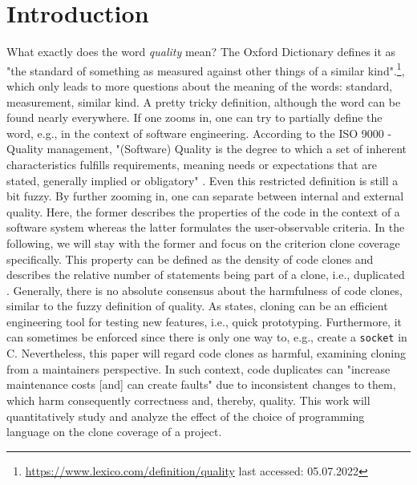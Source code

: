 
\section{Introduction}
\label{sec:intro}

What exactly does the word \textit{quality} mean? The Oxford Dictionary defines it as "the standard of something as measured against other things of a similar kind".\footnote{\url{https://www.lexico.com/definition/quality} last accessed: 05.07.2022}, which only leads to more questions about the meaning of the words: standard, measurement, similar kind. A pretty tricky definition, although the word can be found nearly everywhere.
If one zooms in, one can try to partially define the word, e.g., in the context of software engineering. According to the ISO 9000 - Quality management, "(Software) Quality is the degree to which a set of inherent characteristics fulfills requirements, meaning needs or expectations that are stated, generally implied or obligatory" \cite{matthes2020ase}.
Even this restricted definition is still a bit fuzzy. By further zooming in, one can separate between internal and external quality. Here, the former describes the properties of the code in the context of a software system \cite{pretschner2022requirements} whereas the latter formulates the user-observable criteria.
In the following, we will stay with the former and focus on the criterion clone coverage specifically.
This property can be defined as the density of code clones and describes the relative number of statements being part of a clone, i.e., duplicated \cite{knilling2020priorisierung}.
Generally, there is no absolute consensus about the harmfulness of code clones, similar to the fuzzy definition of quality. As \cite{kasper2006cloning} states, cloning can be an efficient engineering tool for testing new features, i.e., quick prototyping. Furthermore, it can sometimes be enforced since there is only one way to, e.g., create a \texttt{socket} in C.
Nevertheless, this paper will regard code clones as harmful, examining cloning from a maintainers perspective. In such context, code duplicates can "increase maintenance costs [and] can create faults" \cite{juergens2009code} due to inconsistent changes to them, which harm consequently correctness and, thereby, quality.
This work will quantitatively study and analyze the effect of the choice of programming language on the clone coverage of a project.